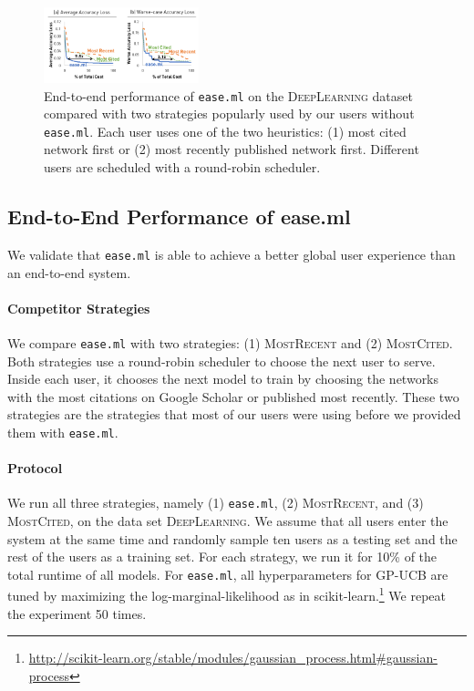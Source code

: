 \documentclass[letterpaper]{vldb}
\newcommand{\eml}{\texttt{ease.ml}\xspace}
\begin{document}
\begin{figure}[t!]
\centering
\includegraphics[width=0.4\textwidth]{figures/main}
\vspace{-1.5em}
\caption{End-to-end performance of
\texttt{ease.ml} on the
\textsc{DeepLearning} dataset
compared with two strategies
popularly used by our users 
without \texttt{ease.ml}. 
Each user uses one of
the two heuristics:
(1) most cited network first or
(2) most recently published network first. 
Different users are
scheduled with a round-robin scheduler.}
\label{fig:end-to-end}
\vspace{-1em}
\end{figure}

\subsection{End-to-End Performance of ease.ml}

We validate that \eml is able to achieve
a better global user experience than
an end-to-end system.

\vspace{-1em}
\paragraph*{Competitor Strategies}
We compare \eml with two strategies:
(1) \textsc{MostRecent} and (2) \textsc{MostCited}.
Both strategies use a round-robin scheduler
to choose the next user to serve. Inside
each user, it chooses the next model to train
by choosing the networks with the
most citations on Google Scholar or
published most recently. These two strategies
are the strategies that most of our users
were using before we provided them with \eml.

\vspace{-1em}
\paragraph*{Protocol} We run all
three strategies, namely (1) \eml,
(2) \textsc{MostRecent}, and (3) 
\textsc{MostCited}, on the 
data set \textsc{DeepLearning}.
We assume that all users enter the system 
at the same time and randomly sample
ten users as a testing set and the rest of the
users as a training set. For each
strategy, we run it for 10\% of the
total runtime of all models.
For \eml, all hyperparameters 
for GP-UCB are tuned by
maximizing the log-marginal-likelihood
as in scikit-learn.\footnote{\scriptsize
\url{http://scikit-learn.org/stable/modules/gaussian_process.html#gaussian-process}}
We repeat the experiment 50 times. 
\end{document}
